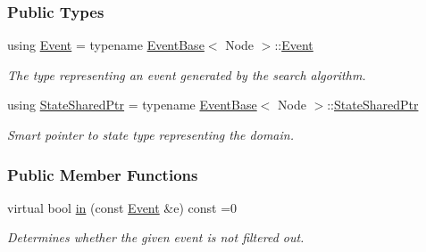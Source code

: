 \subsubsection*{Public Types}
\begin{DoxyCompactItemize}
\item 
using \hyperlink{structslb_1_1core_1_1ui_1_1FilterBase_a4cf70d819855984dc0e15a036e8b8a14}{Event} = typename \hyperlink{structslb_1_1core_1_1ui_1_1EventBase}{Event\+Base}$<$ Node $>$\+::\hyperlink{structslb_1_1core_1_1ui_1_1FilterBase_a4cf70d819855984dc0e15a036e8b8a14}{Event}\hypertarget{structslb_1_1core_1_1ui_1_1FilterBase_a4cf70d819855984dc0e15a036e8b8a14}{}\label{structslb_1_1core_1_1ui_1_1FilterBase_a4cf70d819855984dc0e15a036e8b8a14}

\begin{DoxyCompactList}\small\item\em The type representing an event generated by the search algorithm. \end{DoxyCompactList}\item 
using \hyperlink{structslb_1_1core_1_1ui_1_1FilterBase_abb00418d744ad7aaa7c9333ec1dc2064}{State\+Shared\+Ptr} = typename \hyperlink{structslb_1_1core_1_1ui_1_1EventBase}{Event\+Base}$<$ Node $>$\+::\hyperlink{structslb_1_1core_1_1ui_1_1FilterBase_abb00418d744ad7aaa7c9333ec1dc2064}{State\+Shared\+Ptr}\hypertarget{structslb_1_1core_1_1ui_1_1FilterBase_abb00418d744ad7aaa7c9333ec1dc2064}{}\label{structslb_1_1core_1_1ui_1_1FilterBase_abb00418d744ad7aaa7c9333ec1dc2064}

\begin{DoxyCompactList}\small\item\em Smart pointer to state type representing the domain. \end{DoxyCompactList}\end{DoxyCompactItemize}
\subsubsection*{Public Member Functions}
\begin{DoxyCompactItemize}
\item 
virtual bool \hyperlink{structslb_1_1core_1_1ui_1_1FilterBase_af89dfa7be8a61ad95f688b43f40379ad}{in} (const \hyperlink{structslb_1_1core_1_1ui_1_1FilterBase_a4cf70d819855984dc0e15a036e8b8a14}{Event} \&e) const =0
\begin{DoxyCompactList}\small\item\em Determines whether the given event is not filtered out. \end{DoxyCompactList}\end{DoxyCompactItemize}


